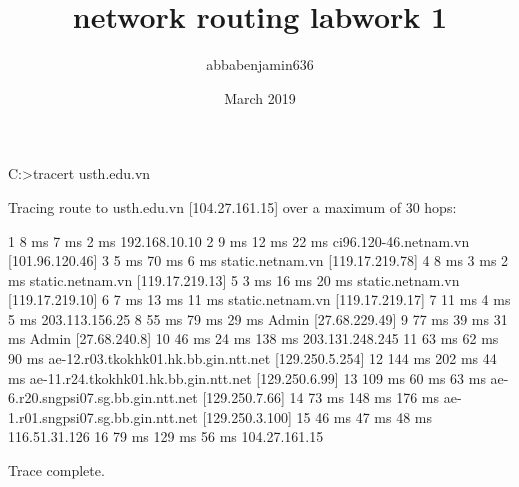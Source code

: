 \documentclass{article}
\title{network routing labwork 1}
\author{abbabenjamin636 }
\date{March 2019}
\begin{document}
\maketitle

C:\Users\Admin>tracert  usth.edu.vn

Tracing route to usth.edu.vn [104.27.161.15]
over a maximum of 30 hops:

  1     8 ms     7 ms     2 ms  192.168.10.10
  2     9 ms    12 ms    22 ms  ci96.120-46.netnam.vn [101.96.120.46]
  3     5 ms    70 ms     6 ms  static.netnam.vn [119.17.219.78]
  4     8 ms     3 ms     2 ms  static.netnam.vn [119.17.219.13]
  5     3 ms    16 ms    20 ms  static.netnam.vn [119.17.219.10]
  6     7 ms    13 ms    11 ms  static.netnam.vn [119.17.219.17]
  7    11 ms     4 ms     5 ms  203.113.156.25
  8    55 ms    79 ms    29 ms  Admin [27.68.229.49]
  9    77 ms    39 ms    31 ms  Admin [27.68.240.8]
 10    46 ms    24 ms   138 ms  203.131.248.245
 11    63 ms    62 ms    90 ms  ae-12.r03.tkokhk01.hk.bb.gin.ntt.net [129.250.5.254]
 12   144 ms   202 ms    44 ms  ae-11.r24.tkokhk01.hk.bb.gin.ntt.net [129.250.6.99]
 13   109 ms    60 ms    63 ms  ae-6.r20.sngpsi07.sg.bb.gin.ntt.net [129.250.7.66]
 14    73 ms   148 ms   176 ms  ae-1.r01.sngpsi07.sg.bb.gin.ntt.net [129.250.3.100]
 15    46 ms    47 ms    48 ms  116.51.31.126
 16    79 ms   129 ms    56 ms  104.27.161.15

Trace complete.
\end{document}
